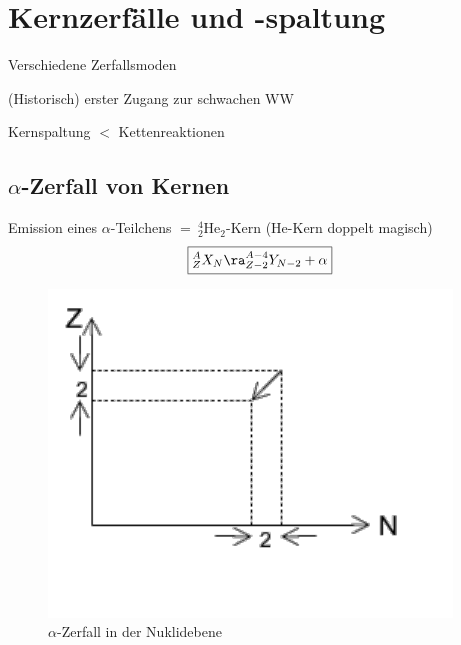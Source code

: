 \chapter{Kernzerfälle und -spaltung}
\begin{compactitem}
\item Verschiedene Zerfallsmoden
\item (Historisch) erster Zugang zur schwachen WW
\item Kernspaltung $\lt$ Kettenreaktionen
\end{compactitem}
\section{\texorpdfstring{$\alpha$}{}-Zerfall von Kernen}
Emission eines $\alpha$-Teilchens $= \ ^4_2\text{He}_2$-Kern (He-Kern doppelt magisch)
\begin{align}
\boxed{
^A_Z X_N \ra ^{A-4}_{Z-2} Y_{N-2} + \alpha
}
\end{align}
\begin{figure}[!ht]
\centering
\includegraphics[width=.4\textwidth]{imgs/ep5-fig-5-1.pdf}
\caption{$\alpha$-Zerfall in der Nuklidebene \label{fig:5.1}}
\end{figure}

